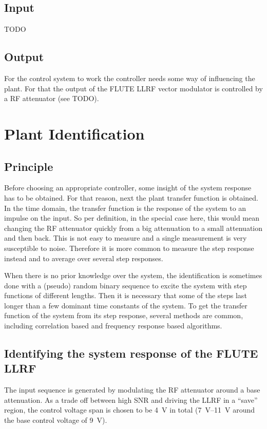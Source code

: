 \subsection{Input}
TODO

\subsection{Output}
For the control system to work the controller needs some way of influencing the plant. For that the output of the FLUTE LLRF vector modulator is controlled by a RF attenuator (see TODO).

\section{Plant Identification}
\subsection{Principle}
Before choosing an appropriate controller, some insight of the system response has to be obtained. For that reason, next the plant transfer function is obtained. In the time domain, the transfer function is the response of the system to an impulse on the input. So per definition, in the special case here, this would mean changing the RF attenuator quickly from a big attenuation to a small attenuation and then back. This is not easy to measure and a single measurement is very susceptible to noise. Therefore it is more common to measure the step response instead and to average over several step responses.

When there is no prior knowledge over the system, the identification is sometimes done with a (pseudo) random binary sequence to excite the system with step functions of different lengths. Then it is necessary that some of the steps last longer than a few dominant time constants of the system. To get the transfer function of the system from its step response, several methods are common, including correlation based and frequency response based algorithms.

\subsection{Identifying the system response of the FLUTE LLRF}
The input sequence is generated by modulating the RF attenuator around a base attenuation. As a trade off between high SNR and driving the LLRF in a ``save'' region, the control voltage span is chosen to be \SI{4}{\volt} in total (\SIrange{7}{11}{\volt} around the base control voltage of \SI{9}{\volt}).

